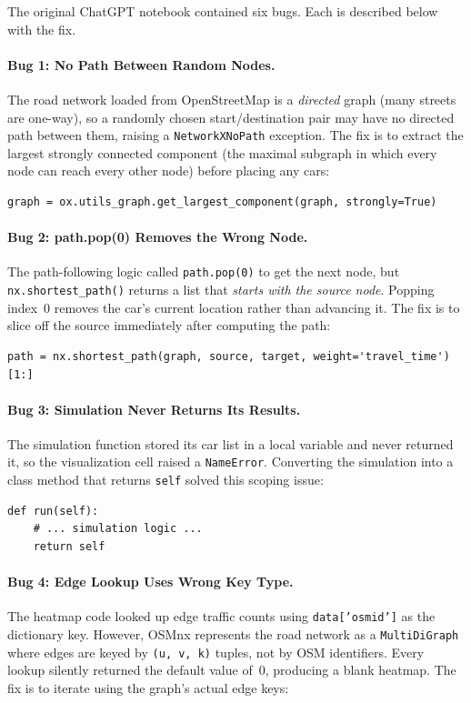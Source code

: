 \documentclass[12pt]{article}
\begin{document}
The original ChatGPT notebook contained six bugs. Each is described below with the fix.

\paragraph{Bug 1: No Path Between Random Nodes.}
The road network loaded from OpenStreetMap is a \textit{directed} graph (many streets are one-way), so a randomly chosen start/destination pair may have no directed path between them, raising a \texttt{NetworkXNoPath} exception. The fix is to extract the largest strongly connected component (the maximal subgraph in which every node can reach every other node) before placing any cars:

\begin{lstlisting}
graph = ox.utils_graph.get_largest_component(graph, strongly=True)
\end{lstlisting}

\paragraph{Bug 2: path.pop(0) Removes the Wrong Node.}
The path-following logic called \texttt{path.pop(0)} to get the next node, but \texttt{nx.shortest\_path()} returns a list that \textit{starts with the source node}. Popping index~0 removes the car's current location rather than advancing it. The fix is to slice off the source immediately after computing the path:

\begin{lstlisting}
path = nx.shortest_path(graph, source, target, weight='travel_time')[1:]
\end{lstlisting}

\paragraph{Bug 3: Simulation Never Returns Its Results.}
The simulation function stored its car list in a local variable and never returned it, so the visualization cell raised a \texttt{NameError}. Converting the simulation into a class method that returns \texttt{self} solved this scoping issue:

\begin{lstlisting}
def run(self):
    # ... simulation logic ...
    return self
\end{lstlisting}

\paragraph{Bug 4: Edge Lookup Uses Wrong Key Type.}
The heatmap code looked up edge traffic counts using \texttt{data['osmid']} as the dictionary key. However, OSMnx represents the road network as a \texttt{MultiDiGraph} where edges are keyed by \texttt{(u, v, k)} tuples, not by OSM identifiers. Every lookup silently returned the default value of~0, producing a blank heatmap. The fix is to iterate using the graph's actual edge keys:
\end{document}
